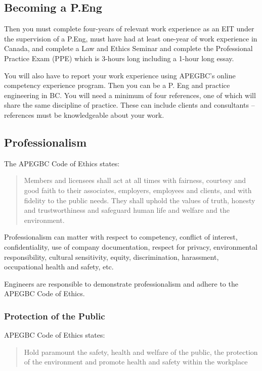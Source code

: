 \documentclass{article}
\begin{document}
\subsection{Becoming a P.Eng}
Then you must complete four-years of relevant work experience as an EIT under the supervision of a P.Eng, must have had at least one-year of work experience in Canada, and complete a Law and Ethics Seminar and complete the Professional Practice Exam (PPE) which is 3-hours long including a 1-hour long essay.

You will also have to report your work experience using APEGBC's online competency experience program. Then you can be a P. Eng and practice engineering in BC. You will need a minimum of four references, one of which will share the same discipline of practice. These can include clients and consultants -- references must be knowledgeable about your work.


\subsection{Professionalism}

The APEGBC Code of Ethics states: \begin{quote}Members and
licensees shall act at all times with fairness, courtesy
and good faith to their associates, employers,
employees and clients, and with fidelity to the public
needs. They shall uphold the values of truth, honesty
and trustworthiness and safeguard human life and
welfare and the environment.
\end{quote}

Professionalism can matter with respect to competency, conflict of interest, confidentiality, use of company documentation, respect for privacy, environmental responsibility, cultural sensitivity, equity, discrimination, harassment, occupational health and safety, etc.

Engineers are responsible to demonstrate professionalism and adhere to the APEGBC Code of Ethics.

\subsubsection{Protection of the Public}

APEGBC Code of Ethics states:  \begin{quote}Hold paramount the safety,
health and welfare of the public, the protection of the
environment and promote health and safety within the
workplace
\end{quote}
\end{document}
